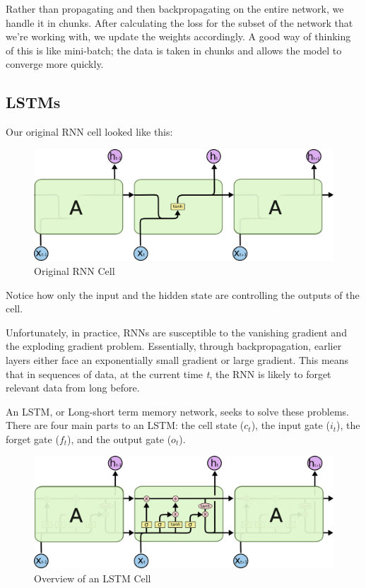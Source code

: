 \documentclass{article}
\begin{document}
Rather than propagating and then backpropagating on the entire network, we handle it in chunks. After calculating the loss for the subset of the network that we're working with, we update the weights accordingly. A good way of thinking of this is like mini-batch; the data is taken in chunks and allows the model to converge more quickly.


\subsection{LSTMs}
Our original RNN cell looked like this: 

\begin{figure}[H]
\centering
\includegraphics[scale=0.4]{lstm/rnn_basic_cell.png}
\caption{Original RNN Cell}
\label{fig:rnn_basic_cell}
\end{figure}

Notice how only the input and the hidden state are controlling the outputs of the cell.

Unfortunately, in practice, RNNs are susceptible to the vanishing gradient and the exploding gradient problem. Essentially, through backpropagation, earlier layers either face an exponentially small gradient or large gradient. This means that in sequences of data, at the current time \textit{t}, the RNN is likely to forget relevant data from long before. 

An LSTM, or Long-short term memory network, seeks to solve these problems. There are four main parts to an LSTM: the cell state ($c_{t}$), the input gate ($i_{t}$), the forget gate ($f_{t}$), and the output gate ($o_{t}$).

\begin{figure}[H]
\centering
\includegraphics[scale=0.4]{lstm/lstm_main.png}
\caption{Overview of an LSTM Cell}
\label{fig:lstm_main}
\end{figure}
\end{document}
